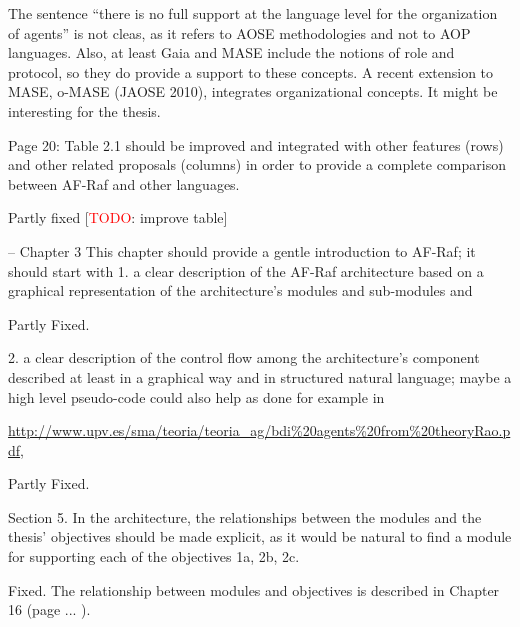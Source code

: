 \documentclass{article}
\newcommand{\todo}[1]{[\textcolor{red}{TODO}: #1]}
\newenvironment{them}{\noindent\begingroup\color{blue}}{\endgroup\par}
\begin{document}
\begin{them}

The sentence “there is no full support at the language level for the
organization of agents” is not cleas, as it refers to AOSE methodologies and
not to AOP languages. Also, at least Gaia and MASE include the notions of role
and protocol, so they do provide a support to these concepts. A recent
extension to MASE, o-MASE (JAOSE 2010), integrates organizational concepts. It
might be interesting for the thesis.

\end{them}
\todo{make this clear in the thesis} 

\begin{them}

Page 20:
Table 2.1 should be improved and integrated with other features (rows) and
other related proposals (columns) in order to provide a complete comparison
between AF-Raf and other languages.

\end{them}
Partly fixed
\todo{improve table}

\begin{them}

-- Chapter 3
This chapter should provide a gentle introduction to AF-Raf; it should start
with 1. a clear description of the AF-Raf architecture based on a graphical
representation of the architecture's modules and sub-modules and

\end{them}
Partly Fixed. 

\begin{them}

2. a clear description of the control flow among the architecture's component
described at least in a graphical way and in structured natural language; maybe
a high level pseudo-code could also help as done for example in

\url{http://www.upv.es/sma/teoria/teoria_ag/bdi\%20agents\%20from\%20theoryRao.pdf},
\end{them}
Partly Fixed. 

\begin{them}

Section 5.
In the architecture, the relationships between the modules and the thesis'
objectives should be made explicit, as it would be natural to find a module for
supporting each of the objectives 1a, 2b, 2c.

\end{them}
Fixed. The relationship between modules and objectives is described in Chapter
16 (page ... ).
\end{document}
